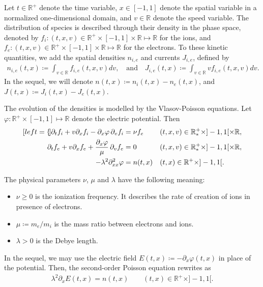 \documentclass{article}
\numberwithin{equation}{section}
\newcommand{\R}{\mathbb{R}}
\newcommand{\mysubeq}[2]{ %
	\begin{subequations}\label{#1}
		\begin{align}[left = {\empheqlbrace}]
			#2
		\end{align}
	\end{subequations}	
}
\begin{document}
Let $t\in\mathbb{R}^+$ denote the time variable, $x\in [-1,1]$ denote the spatial variable in a normalized one-dimensional domain, and $v\in\mathbb{R}$ denote the speed variable. The distribution of species is described through their density in the phase space, denoted by $f_i : (t,x,v) \in \R^+ \times [-1,1]\times \R \mapsto \R$ for the ions, and $f_e : (t,x,v) \in \R^+ \times [-1,1]\times \R \mapsto \R$ for the electrons. To these kinetic quantities, we add the spatial densities $n_{i,e}$ and currents $J_{i,e}$, defined by
\begin{align}\label{eq:def_ni_ne}
	n_{i,e} (t,x) \coloneqq \int_{v\in\R} f_{i,e} (t,x,v) dv, \quad\text{and}\quad J_{i,e} (t,x) \coloneqq \int_{v\in\R} v f_{i,e} (t,x,v) dv. 
\end{align}
In the sequel, we will denote $n (t,x) \coloneqq n_i (t,x) - n_e(t,x)$, and $J(t,x) \coloneqq J_i(t,x) - J_e(t,x)$.

The evolution of the densities is modelled by the Vlasov-Poisson equations. Let $\varphi : \R^+ \times [-1,1] \mapsto \R$ denote the electric potential. Then
\mysubeq{eq:unsta_model}{
	\partial_t f_i + v \partial_x f_i - \partial_x \varphi \, \partial_v f_i &= \nu f_e && (t,x,v) \in \R_{*}^{+} \times ]-1,1[ \times \R, \label{eq:unsta_model_fi} \\
	\partial_t f_e + v \partial_x f_e + \frac{\partial_x \varphi }{\mu}\, \partial_v f_e &= 0 \quad\quad && (t,x,v) \in \R_{*}^{+} \times ]-1,1[ \times \R, \label{eq:unsta_model_fe} \\
	- \lambda^2 \partial^2_{xx} \varphi &= n (t,x) && (t,x) \in \R^{+} \times ]-1,1[. \label{eq:unsta_model_phi}
}
The physical parameters $\nu$, $\mu$ and $\lambda$ have the following meaning:
\begin{itemize}
\item $\nu \geqslant 0$ is the ionization frequency. It describes the rate of creation %
of ions in presence of electrons.
\item $\mu \coloneqq m_e / m_i$ is the mass ratio between electrons and ions.
\item $\lambda > 0$ is the Debye length.
\end{itemize}

In the sequel, we may use the electric field $E(t,x) \coloneqq - \partial_x \varphi(t,x)$ in place of the potential. Then, the second-order Poisson equation rewrites as 
\begin{align}
	\lambda^2 \partial_x E (t,x) = n(t,x) \quad \quad (t,x) \in \R^{+} \times ]-1,1[. \label{eq:unsta_model_E}
\end{align}
\end{document}
